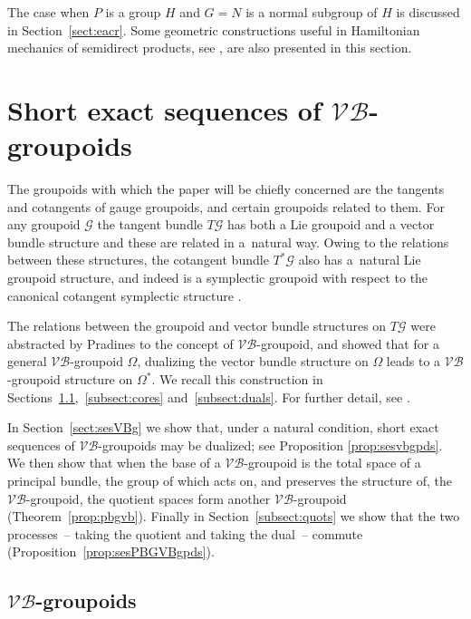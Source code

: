 \documentclass[10pt,a4paper]{amsart}
\newcommand{\gold}{\mscr{G}}
\newcommand{\mscr}[1]{\mathscr{#1}}
\newcommand{\Om}{\Omega}
\numberwithin{equation}{section}
\begin{document}
The case when $P$ is a group $H$ and $G=N$ is a normal subgroup of $H$ is discussed in Section~\ref{sect:eacr}. Some geometric constructions useful in Hamiltonian mechanics of semidirect products, see \cite{ratiu1, holm, ratiu2, ReymanSTS}, are also presented in this section.

\section[Short exact sequences of $\mathcal{V}\!\mathcal{B}$-groupoids]{Short exact sequences of $\boldsymbol{\mathcal{V}\!\mathcal{B}}$-groupoids}\label{sect:prelims}

The groupoids with which the paper will be chief\/ly concerned are the tangents and cotangents of gauge groupoids, and certain groupoids related to them. For any groupoid $\gold$ the tangent bundle $T\gold$ has both a Lie groupoid and a vector bundle structure and these are related in a~natural way. Owing to the relations between these structures, the cotangent bundle $T^*\gold$ also has a~natural Lie groupoid structure, and indeed is a symplectic groupoid with respect to the canonical cotangent symplectic structure \cite{CDW}.

The relations between the groupoid and vector bundle structures on $T\gold$ were abstracted by Pradines \cite{Pradines:1988} to the concept of $\mathcal{V}\!\mathcal{B}$-groupoid, and \cite{Pradines:1988} showed that for a general $\mathcal{V}\!\mathcal{B}$-groupoid $\Om$, dualizing the vector bundle structure on $\Om$ leads to a $\mathcal{V}\!\mathcal{B}$-groupoid structure on $\Om^*$. We recall this construction in Sections~\ref{subsect:VBgpds},~\ref{subsect:cores} and~\ref{subsect:duals}. For further detail, see \cite[Chapter~11]{Mackenzie:GT}.

In Section~\ref{sect:sesVBg} we show that, under a natural condition, short exact sequences of $\mathcal{V}\!\mathcal{B}$-groupoids may be dualized; see Proposition \ref{prop:sesvbgpds}. We then show that when the base of a $\mathcal{V}\!\mathcal{B}$-groupoid is the total space of a principal bundle, the group of which acts on, and preserves the structure of, the $\mathcal{V}\!\mathcal{B}$-groupoid, the quotient spaces form another $\mathcal{V}\!\mathcal{B}$-groupoid (Theorem~\ref{prop:pbgvb}). Finally in Section~\ref{subsect:quots} we show that the two processes~-- taking the quotient and taking the dual~-- commute (Proposition~\ref{prop:sesPBGVBgpds}).

\subsection[$\mathcal{V}\!\mathcal{B}$-groupoids]{$\boldsymbol{\mathcal{V}\!\mathcal{B}}$-groupoids} \label{subsect:VBgpds}
\end{document}
